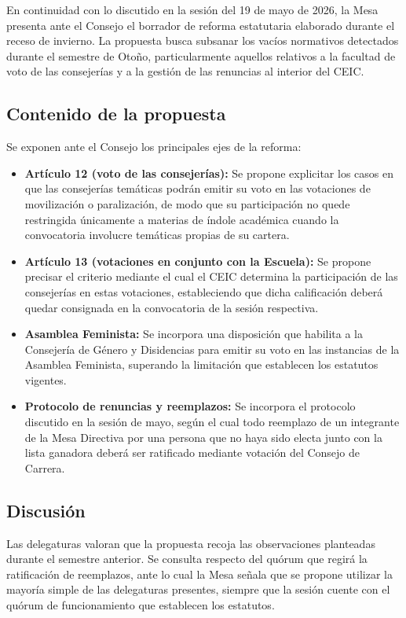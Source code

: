 \documentclass[12pt,letterpaper]{article}
\begin{document}
En continuidad con lo discutido en la sesión del 19 de mayo de 2026, la Mesa presenta ante el Consejo el borrador de reforma estatutaria elaborado durante el receso de invierno. La propuesta busca subsanar los vacíos normativos detectados durante el semestre de Otoño, particularmente aquellos relativos a la facultad de voto de las consejerías y a la gestión de las renuncias al interior del CEIC.

\subsection{Contenido de la propuesta}

Se exponen ante el Consejo los principales ejes de la reforma:

\begin{itemize}
  \item \textbf{Artículo 12 (voto de las consejerías):} Se propone explicitar los casos en que las consejerías temáticas podrán emitir su voto en las votaciones de movilización o paralización, de modo que su participación no quede restringida únicamente a materias de índole académica cuando la convocatoria involucre temáticas propias de su cartera.
  \item \textbf{Artículo 13 (votaciones en conjunto con la Escuela):} Se propone precisar el criterio mediante el cual el CEIC determina la participación de las consejerías en estas votaciones, estableciendo que dicha calificación deberá quedar consignada en la convocatoria de la sesión respectiva.
  \item \textbf{Asamblea Feminista:} Se incorpora una disposición que habilita a la Consejería de Género y Disidencias para emitir su voto en las instancias de la Asamblea Feminista, superando la limitación que establecen los estatutos vigentes.
  \item \textbf{Protocolo de renuncias y reemplazos:} Se incorpora el protocolo discutido en la sesión de mayo, según el cual todo reemplazo de un integrante de la Mesa Directiva por una persona que no haya sido electa junto con la lista ganadora deberá ser ratificado mediante votación del Consejo de Carrera.
\end{itemize}

\subsection{Discusión}

Las delegaturas valoran que la propuesta recoja las observaciones planteadas durante el semestre anterior. Se consulta respecto del quórum que regirá la ratificación de reemplazos, ante lo cual la Mesa señala que se propone utilizar la mayoría simple de las delegaturas presentes, siempre que la sesión cuente con el quórum de funcionamiento que establecen los estatutos.
\end{document}
